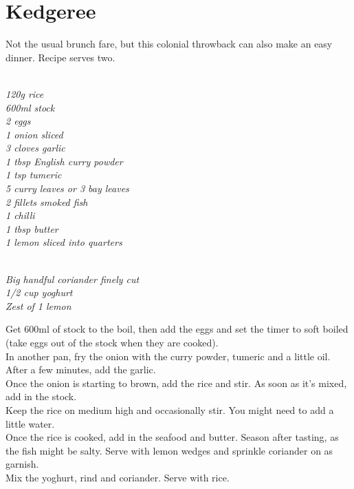 \documentclass{tufte-book}
\begin{document}
\section{Kedgeree}

Not the usual brunch fare, but this colonial throwback can also make an easy dinner. Recipe serves two.

\smallskip
{}
\\\emph{120g rice
\\600ml stock
\\2 eggs
\\1 onion sliced
\\3 cloves garlic
\\1 tbsp English curry powder
\\1 tsp tumeric
\\5 curry leaves or 3 bay leaves
\\2 fillets smoked fish
\\1 chilli
\\1 tbsp butter
\\1 lemon sliced into quarters
}

\newpage

\\\emph{Big handful coriander finely cut
\\1/2 cup yoghurt
\\Zest of 1 lemon
}

\smallskip
Get 600ml of stock to the boil, then add the eggs and set the timer to soft boiled (take eggs out of the stock when they are cooked).
\\In another pan, fry the onion with the curry powder, tumeric and a little oil. After a few minutes, add the garlic.
\\Once the onion is starting to brown, add the rice and stir. As soon as it's mixed, add in the stock. 
\\Keep the rice on medium high and occasionally stir. You might need to add a little water.
\\Once the rice is cooked, add in the seafood and butter. Season after tasting, as the fish might be salty. Serve with lemon wedges and sprinkle coriander on as garnish.
\\Mix the yoghurt, rind and coriander. Serve with rice.
\end{document}
